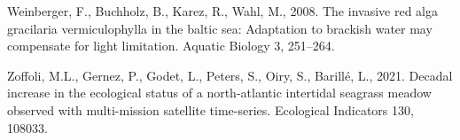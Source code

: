 \documentclass[
  letterpaper,
  DIV=11,
  numbers=noendperiod]{scrartcl}
\newlength{\cslhangindent}
\newenvironment{CSLReferences}[2] %
 {\begin{list}{}{%
  \setlength{\itemindent}{0pt}
  \setlength{\leftmargin}{0pt}
  \setlength{\parsep}{0pt}
  \ifodd #1
   \setlength{\leftmargin}{\cslhangindent}
   \setlength{\itemindent}{-1\cslhangindent}
  \fi
  \setlength{\itemsep}{#2\baselineskip}}}
 {\end{list}}
\begin{document}
\begin{CSLReferences}{1}{0}
Weinberger, F., Buchholz, B., Karez, R., Wahl, M., 2008. The invasive
red alga gracilaria vermiculophylla in the baltic sea: Adaptation to
brackish water may compensate for light limitation. Aquatic Biology 3,
251--264.

Zoffoli, M.L., Gernez, P., Godet, L., Peters, S., Oiry, S., Barillé, L.,
2021. Decadal increase in the ecological status of a north-atlantic
intertidal seagrass meadow observed with multi-mission satellite
time-series. Ecological Indicators 130, 108033.

\end{CSLReferences}
\end{document}

